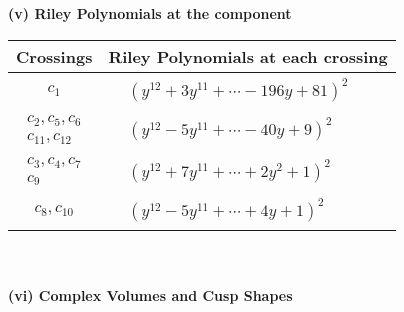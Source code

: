\documentclass[1p]{elsarticle_modified}
\theoremstyle{definition}
\begin{document}
\newpage\renewcommand{\arraystretch}{1}
\flushleft \textbf{(v) Riley Polynomials at the component}\newline \\
\begin{tabular}{m{50pt}|m{274pt}}
Crossings & \hspace{64pt}Riley Polynomials at each crossing \\
\hline $$\begin{aligned}c_{1}\end{aligned}$$&$\begin{aligned}
&(y^{12}+3 y^{11}+\cdots-196 y+81)^{2}
\end{aligned}$\\
\hline $$\begin{aligned}c_{2},c_{5},c_{6}\\c_{11},c_{12}\end{aligned}$$&$\begin{aligned}
&(y^{12}-5 y^{11}+\cdots-40 y+9)^{2}
\end{aligned}$\\
\hline $$\begin{aligned}c_{3},c_{4},c_{7}\\c_{9}\end{aligned}$$&$\begin{aligned}
&(y^{12}+7 y^{11}+\cdots+2 y^2+1)^{2}
\end{aligned}$\\
\hline $$\begin{aligned}c_{8},c_{10}\end{aligned}$$&$\begin{aligned}
&(y^{12}-5 y^{11}+\cdots+4 y+1)^{2}
\end{aligned}$\\
\hline
\end{tabular}\\~\\
\newpage\flushleft \textbf{(vi) Complex Volumes and Cusp Shapes}
\end{document}
